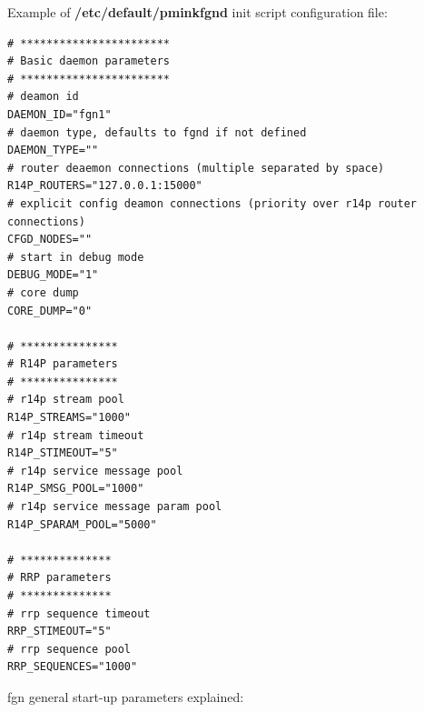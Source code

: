 \documentclass[a4paper,latin]{paper}
\begin{document}
\noindent{}Example of \textbf{/etc/default/pmink\textunderscore{}fgnd} init script configuration file:
\begin{lstlisting}[style=BashInputStyle, belowskip=\baselineskip]
# ***********************
# Basic daemon parameters
# ***********************
# deamon id
DAEMON_ID="fgn1"
# daemon type, defaults to fgnd if not defined
DAEMON_TYPE=""
# router deaemon connections (multiple separated by space)
R14P_ROUTERS="127.0.0.1:15000"
# explicit config deamon connections (priority over r14p router connections)
CFGD_NODES=""
# start in debug mode
DEBUG_MODE="1"
# core dump
CORE_DUMP="0"

# ***************
# R14P parameters
# ***************
# r14p stream pool
R14P_STREAMS="1000"
# r14p stream timeout
R14P_STIMEOUT="5"
# r14p service message pool
R14P_SMSG_POOL="1000"
# r14p service message param pool
R14P_SPARAM_POOL="5000"

# **************
# RRP parameters
# **************
# rrp sequence timeout
RRP_STIMEOUT="5"
# rrp sequence pool
RRP_SEQUENCES="1000"
\end{lstlisting}
\noindent{}\acrfull{fgn} general start-up parameters explained:\\
\end{document}
